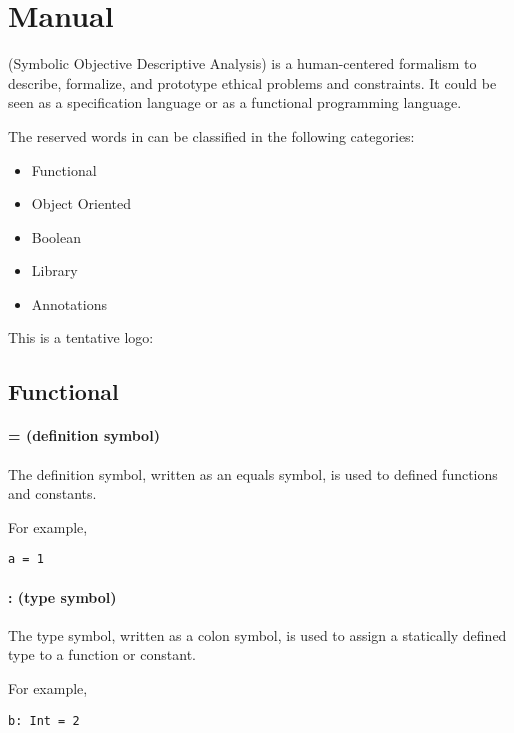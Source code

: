 \chapter{Manual}

\Soda (Symbolic Objective Descriptive Analysis) is a human-centered formalism to describe, formalize, and prototype ethical problems and constraints.
It could be seen as a specification language or as a functional programming language.

The reserved words in \Soda can be classified in the following categories:

\begin{itemize}
    \item Functional
    \item Object Oriented
    \item Boolean
    \item Library
    \item Annotations
\end{itemize}



This is a tentative logo:

\Sodalogo


\section{Functional}

\subsubsection{= (definition symbol)}

The definition symbol, written as an equals symbol, is used to defined functions and constants.

For example,
\begin{lstlisting}[label={lst:exampleDef}]
  a = 1
\end{lstlisting}

\subsubsection{: (type symbol)}

The type symbol, written as a colon symbol, is used to assign a statically defined type to a function or constant.

For example,
\begin{lstlisting}[label={lst:exampleType01}]
  b: Int = 2
\end{lstlisting}

